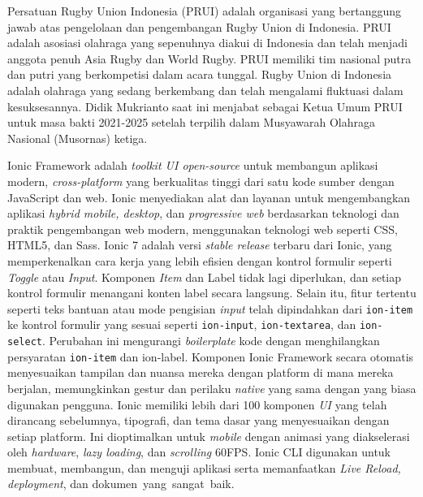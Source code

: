 \documentclass[a4paper,twoside]{article}
\begin{document}

Persatuan Rugby Union Indonesia (PRUI) adalah organisasi yang bertanggung jawab atas pengelolaan dan pengembangan Rugby Union di Indonesia. PRUI adalah asosiasi olahraga yang sepenuhnya diakui di Indonesia dan telah menjadi anggota penuh Asia Rugby dan World Rugby. PRUI memiliki tim nasional putra dan putri yang berkompetisi dalam acara tunggal. Rugby Union di Indonesia adalah olahraga yang sedang berkembang dan telah mengalami fluktuasi dalam kesuksesannya. Didik Mukrianto saat ini menjabat sebagai Ketua Umum PRUI untuk masa bakti 2021-2025 setelah terpilih dalam Musyawarah Olahraga Nasional (Musornas) ketiga.

Ionic Framework adalah \textit{toolkit UI open-source} untuk membangun aplikasi modern, \textit{cross-platform} yang berkualitas tinggi dari satu kode sumber dengan JavaScript dan web. Ionic menyediakan alat dan layanan untuk mengembangkan aplikasi \textit{hybrid mobile, desktop}, dan \textit{progressive web} berdasarkan teknologi dan praktik pengembangan web modern, menggunakan teknologi web seperti CSS, HTML5, dan Sass. Ionic 7 adalah versi \textit{stable release} terbaru dari Ionic, yang memperkenalkan cara kerja yang lebih efisien dengan kontrol formulir seperti \textit{Toggle} atau \textit{Input}. Komponen \textit{Item} dan Label tidak lagi diperlukan, dan setiap kontrol formulir menangani konten label secara langsung. Selain itu, fitur tertentu seperti teks bantuan atau mode pengisian \textit{input} telah dipindahkan dari \texttt{ion-item} ke kontrol formulir yang sesuai seperti \texttt{ion-input}, \texttt{ion-textarea}, dan \texttt{ion-select}. Perubahan ini mengurangi \textit{boilerplate} kode dengan menghilangkan persyaratan \texttt{ion-item} dan ion-label. Komponen Ionic Framework secara otomatis menyesuaikan tampilan dan nuansa mereka dengan platform di mana mereka berjalan, memungkinkan gestur dan perilaku \textit{native} yang sama dengan yang biasa digunakan pengguna. Ionic memiliki lebih dari 100 komponen \textit{UI} yang telah dirancang sebelumnya, tipografi, dan tema dasar yang menyesuaikan dengan setiap platform. Ini dioptimalkan untuk \textit{mobile} dengan animasi yang diakselerasi oleh \textit{hardware}, \textit{lazy loading}, dan \textit{scrolling} 60FPS. Ionic CLI digunakan untuk membuat, membangun, dan menguji aplikasi serta memanfaatkan \textit{Live Reload, deployment}, dan dokumen~yang~sangat~baik.
\end{document}
